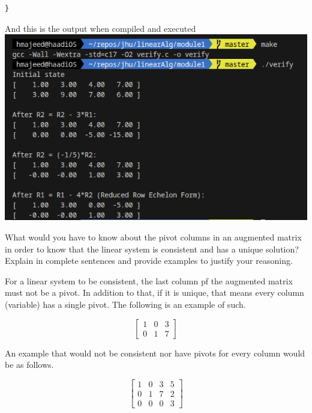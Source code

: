 \documentclass[12pt,letterpaper, onecolumn]{exam}
\begin{document}
\begin{questions}
\begin{solution}
\begin{lstlisting}
}
        \end{lstlisting}
        And this is the output when compiled and executed\\
        \includegraphics{code-tested}
        \end{solution}

    \question What would you have to know about the pivot columns in an augmented
        matrix in order to know that the linear system is consistent and has a
        unique solution? Explain in complete sentences and provide examples to
        justify your reasoning.
    
        \begin{solution}
            For a linear system to be consistent, the last column pf the augmented matrix must not be a pivot. In addition to that, if it is unique, that means every column (variable) has a single pivot. The following is an example of such.

            $$
            \begin{bmatrix}
                1 & 0 & 3\\
                0 & 1 & 7
            \end{bmatrix}
            $$

            An example that would not be consistent nor have pivots for every column would be as follows.
            
            $$
            \begin{bmatrix}
                1 & 0 & 3 & 5\\
                0 & 1 & 7 & 2\\
                0 & 0 & 0 & 3
            \end{bmatrix}
            $$
        \end{solution}


\end{questions}
\end{document}
